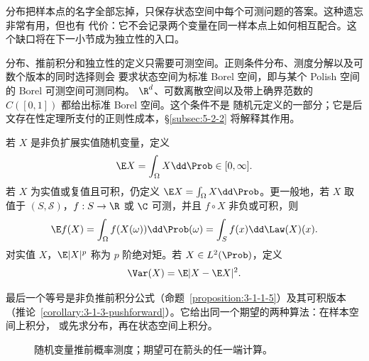 分布把样本点的名字全部忘掉，只保存状态空间中每个可测问题的答案。这种遗忘非常有用，但也有
代价：它不会记录两个变量在同一样本点上如何相互配合。这个缺口将在下一小节成为独立性的入口。

\begin{remark}
\label{rem:5-1-1-standard-borel}
分布、推前积分和独立性的定义只需要可测空间。正则条件分布、测度分解以及可数个版本的同时选择则会
要求状态空间为标准 Borel 空间，即与某个 Polish 空间的 Borel 可测空间可测同构。
$\R^d$、可数离散空间以及带上确界范数的 $C([0,1])$ 都给出标准 Borel 空间。这个条件不是
随机元定义的一部分；它是后文存在性定理所支付的正则性成本，\S\ref{subsec:5-2-2} 将解释其作用。
\end{remark}

\begin{definition}[期望与矩]\label{def:5-1-1-3}
若 $X$ 是非负扩展实值随机变量，定义
\[
  \E X=\int_\Omega X\dd\Prob\in[0,\infty].
\]
若 $X$ 为实值或复值且可积，仍定义 $\E X=\int_\Omega X\dd\Prob$。更一般地，若
$X$ 取值于 $(S,\mathcal S)$，$f:S\to\R$ 或 $\C$ 可测，并且 $f\circ X$ 非负或可积，则
\[
  \E f(X)=\int_\Omega f(X(\omega))\dd\Prob(\omega)
  =\int_S f(x)\dd\Law(X)(x).
\]
对实值 $X$，$\E|X|^p$ 称为 $p$ 阶绝对矩。若 $X\in L^2(\Prob)$，定义
\[
  \Var(X)=\E|X-\E X|^2.
\]
\end{definition}

最后一个等号是非负推前积分公式（命题~\ref{proposition:3-1-1-5}）及其可积版本
（推论~\ref{corollary:3-1-3-pushforward}）。它给出同一个期望的两种算法：在样本空间上积分，
或先求分布，再在状态空间上积分。

\begin{figure}[htbp]
\centering
{}
\caption{随机变量推前概率测度；期望可在箭头的任一端计算。}
\label{fig:5-1-1-pushforward-law}
\end{figure}

